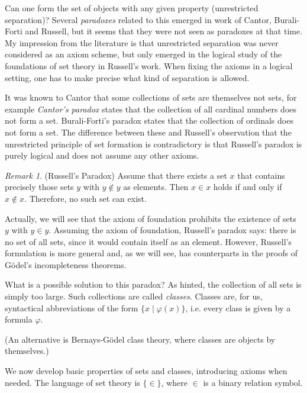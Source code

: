 \documentclass[a4paper, 11pt]{amsart}
\theoremstyle{remark}
\newtheorem{remark}[remark]{Remark}
\newcommand{\axiomft}[1]{\mathsf{#1}}
\newcommand{\ZF}{\axiomft{ZF}}
\begin{document}
Can one form the set of objects with any given property (unrestricted separation)? 
Several \emph{paradoxes} related to this emerged in work of Cantor, Burali-Forti and Russell, but it seems that they were not seen as paradoxes at that time. My impression from the literature is that unrestricted separation was never considered as an axiom scheme, but only emerged in the logical study of the foundations of set theory in Russell's work. 
When fixing the axioms in a logical setting, one has to make precise what kind of separation is allowed. 


It was known to Cantor that 
some collections of sets are themselves not sets, for example \emph{Cantor's paradox} states that the collection of all cardinal numbers does not form a set. 
Burali-Forti's paradox 
states that the  collection of ordinals does not form a set. 
The difference between these and Russell's observation that the unrestricted principle of set formation is contradictory is that Russell's paradox is purely logical and does not assume any other axioms. 


\begin{remark}(Russell's Paradox) 
Assume that there exists a set $x$ that contains precisely those sets $y$ with $y\notin y$ as elements. 
Then $x\in x$ holds if and only if $x\notin x$. 
Therefore,  no such set can exist. 
\end{remark} 

Actually, we will see that the axiom of foundation prohibits the existence of sets $y$ with $y\in y$. 
Assuming the axiom of foundation, Russell's paradox says: 
there is no set of all sets, since it would contain itself as an element. 
However, Russell's formulation is more general and, as we will see, has counterparts in the proofs of G\"odel's incompleteness theorems. 

What is a possible solution to this paradox? As hinted, the collection of all sets is simply too large. 
Such collections are called \emph{classes}. 
Classes are, for us, syntactical abbreviations of the form $\{ x \mid \varphi(x) \}$, i.e. every class is given by a formula $\varphi$. 

(An alternative is Bernays-G\"odel class theory, where classes are objects by themselves.) 

We now develop basic properties of sets and classes, introducing axioms when needed. 
The language of set theory is $\{\in \}$, where $\in$ is a binary relation symbol. 
\end{document}
